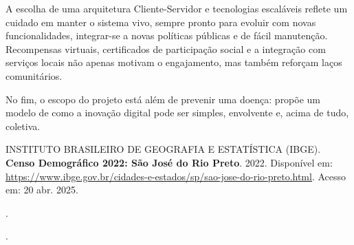 \documentclass[a4paper, 12pt]{article}
\begin{document}
A escolha de uma arquitetura Cliente-Servidor e tecnologias escaláveis reflete um cuidado em manter o sistema vivo, sempre pronto para evoluir com novas funcionalidades, integrar-se a novas políticas públicas e de fácil manutenção. Recompensas virtuais, certificados de participação social e a integração com serviços locais não apenas motivam o engajamento, mas também reforçam laços comunitários.

No fim, o escopo do projeto está além de prevenir uma doença: propõe um modelo de como a inovação digital pode ser simples, envolvente e, acima de tudo, coletiva.

\newpage
\renewcommand{\refname}{Bibliografia}
\begin{thebibliography}{09}
 INSTITUTO BRASILEIRO DE GEOGRAFIA E ESTATÍSTICA (IBGE). 
\textbf{Censo Demográfico 2022: São José do Rio Preto}. 
2022. 
Disponível em: \url{https://www.ibge.gov.br/cidades-e-estados/sp/sao-jose-do-rio-preto.html}. 
Acesso em: 20 abr. 2025.

\bibitem{} %
\textbf{}. %

\bibitem{} %
\textbf{}. %

\end{thebibliography}
\end{document}
